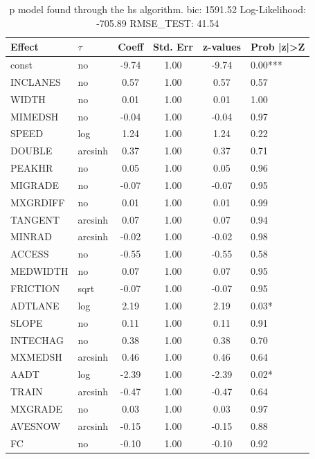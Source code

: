 \begin{table}
	\caption{p model found through the hs algorithm. bic: 1591.52 Log-Likelihood: -705.89 RMSE_TEST: 41.54}
	\begin{center}
		\begin{tabular}{|l|l|c|c|c|l|}
			\hline
			Effect & $\tau$ & Coeff & Std. Err & z-values & Prob |z|>Z \\
			\hline
			const & no & -9.74 & 1.00 & -9.74 & 0.00*** \\
			\hline
			INCLANES & no & 0.57 & 1.00 & 0.57 & 0.57 \\
			\hline
			WIDTH & no & 0.01 & 1.00 & 0.01 & 1.00 \\
			\hline
			MIMEDSH & no & -0.04 & 1.00 & -0.04 & 0.97 \\
			\hline
			SPEED & log & 1.24 & 1.00 & 1.24 & 0.22 \\
			\hline
			DOUBLE & arcsinh & 0.37 & 1.00 & 0.37 & 0.71 \\
			\hline
			PEAKHR & no & 0.05 & 1.00 & 0.05 & 0.96 \\
			\hline
			MIGRADE & no & -0.07 & 1.00 & -0.07 & 0.95 \\
			\hline
			MXGRDIFF & no & 0.01 & 1.00 & 0.01 & 0.99 \\
			\hline
			TANGENT & arcsinh & 0.07 & 1.00 & 0.07 & 0.94 \\
			\hline
			MINRAD & arcsinh & -0.02 & 1.00 & -0.02 & 0.98 \\
			\hline
			ACCESS & no & -0.55 & 1.00 & -0.55 & 0.58 \\
			\hline
			MEDWIDTH & no & 0.07 & 1.00 & 0.07 & 0.95 \\
			\hline
			FRICTION & sqrt & -0.07 & 1.00 & -0.07 & 0.95 \\
			\hline
			ADTLANE & log & 2.19 & 1.00 & 2.19 & 0.03* \\
			\hline
			SLOPE & no & 0.11 & 1.00 & 0.11 & 0.91 \\
			\hline
			INTECHAG & no & 0.38 & 1.00 & 0.38 & 0.70 \\
			\hline
			MXMEDSH & arcsinh & 0.46 & 1.00 & 0.46 & 0.64 \\
			\hline
			AADT & log & -2.39 & 1.00 & -2.39 & 0.02* \\
			\hline
			TRAIN & arcsinh & -0.47 & 1.00 & -0.47 & 0.64 \\
			\hline
			MXGRADE & no & 0.03 & 1.00 & 0.03 & 0.97 \\
			\hline
			AVESNOW & arcsinh & -0.15 & 1.00 & -0.15 & 0.88 \\
			\hline
			FC & no & -0.10 & 1.00 & -0.10 & 0.92 \\

\end{tabular}
\end{center}
\end{table}
